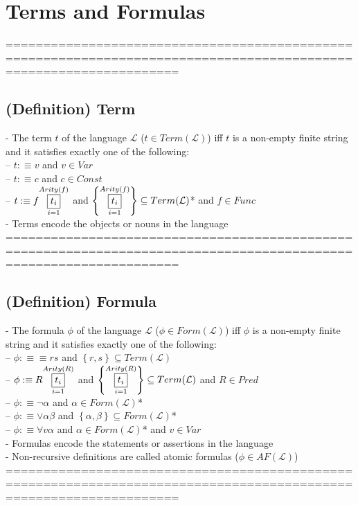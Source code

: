 \documentclass{book}
\newcommand{\is}{:\equiv}
\newcommand{\set}[1]{\left\{ #1 \right\}}
\newcommand{\vdc}[3]{\underset{#2}{\overset{#3}{\fbox{$#1$}}}}
\begin{document}
	\section{Terms and Formulas}
	===================================================================================================================
\subsection{(Definition) Term} %
	- The term $t$ of the language $\mathcal{L}$ ($t \in Term(\mathcal{L})$) iff $t$ is a non-empty finite string and it satisfies exactly one of the following: \\
		-- $t \is v$ and $v \in Var$ \\
		-- $t \is c$ and $c \in Const$ \\
		-- $t \is f \vdc{t_i}{i=1}{Arity(f)}$ and $\set{\vdc{t_i}{i=1}{Arity(f)}} \subseteq Term(\mathcal{L})$* and $f \in Func$ \\
	- Terms encode the objects or nouns in the language \\
	===================================================================================================================
\subsection{(Definition) Formula} %
	- The formula $\phi$ of the language $\mathcal{L}$ ($\phi \in Form(\mathcal{L})$) iff $\phi$ is a non-empty finite string and it satisfies exactly one of the following: \\
		-- $\phi \is \equiv r s$ and $\set{r, s} \subseteq Term(\mathcal{L})$ \\
		-- $\phi \is R \vdc{t_i}{i=1}{Arity(R)}$ and $\set{\vdc{t_i}{i=1}{Arity(R)}} \subseteq Term(\mathcal{L})$ and $R \in Pred$ \\
		-- $\phi \is \lnot \alpha$ and $\alpha \in Form(\mathcal{L})$* \\
		-- $\phi \is \lor \alpha \beta$ and $\set{\alpha, \beta} \subseteq Form(\mathcal{L})$* \\
		-- $\phi \is \forall v \alpha$ and $\alpha \in Form(\mathcal{L})$* and $v \in Var$ \\
	- Formulas encode the statements or assertions in the language \\
	- Non-recursive definitions are called atomic formulas ($\phi \in AF(\mathcal{L})$) \\
	===================================================================================================================
\end{document}
